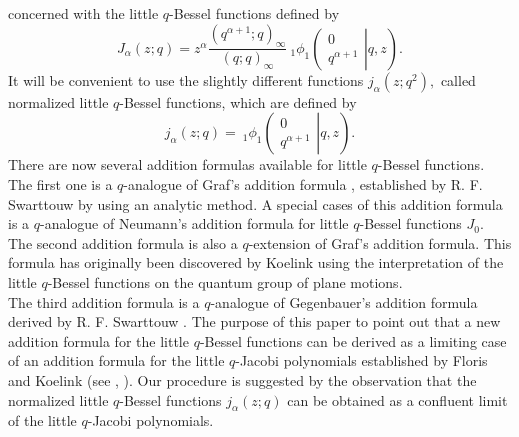 \documentclass[12pt,a4paper]{amsart}
\numberwithin{equation}{section}
\theoremstyle{plain}
\theoremstyle{definition}
\theoremstyle{remark}
\numberwithin{equation}{section}
\numberwithin{table}{section}
\numberwithin{figure}{section}
\begin{document}
concerned with the little $q$-Bessel functions defined by \cite{KoS}
\begin{equation} J_{\alpha}(z;q)=z^{\alpha}\frac{(q^{\alpha+1};q)_{\infty}}{(q;q)_{\infty}} \ _{1}\phi_1\left(\left. \begin{matrix} 0\\
q^{\alpha+1}\end{matrix}\right\vert q,z\right) \label{11}.
\end{equation}
It will be convenient to use the slightly different functions
$j_{\alpha}(z;q^2),$ called normalized little $q$-Bessel functions,
which are defined by \cite{FHB}
\begin{equation}
j_{\alpha}(z;q)=\ _{1}\phi_1\left(\left. \begin{matrix} 0\\
q^{\alpha+1}\end{matrix}\right\vert q,z\right)\label{12}.
\end{equation} There are now several addition formulas available for little
$q$-Bessel functions. The first one is a $q$-analogue of Graf's
addition formula \cite{Sad}, established by R. F. Swarttouw by using
an analytic method. A special cases of this addition formula is a
$q$-analogue of Neumann's addition formula for little $q$-Bessel
functions $J_0$.\\
The second addition formula is also a $q$-extension of Graf's addition
formula. This formula has originally been discovered by Koelink
\cite{KQ} using the interpretation of the little $q$-Bessel
functions on the
quantum group of plane motions.\\
The third addition formula is a $q$-analogue of Gegenbauer's
addition formula derived by R. F. Swarttouw \cite{Sad}. The purpose
of this paper to point out that a new addition formula for the
little $q$-Bessel functions can be derived as a limiting case of an
addition formula for the little $q$-Jacobi polynomials established
by Floris and Koelink (see \cite{FlorisKo}, \cite{Floris}). Our
procedure is suggested by the observation that the normalized little
$q$-Bessel functions $j_{\alpha}(z;q)$ can be obtained as a
confluent limit of the little $q$-Jacobi polynomials.
\end{document}
